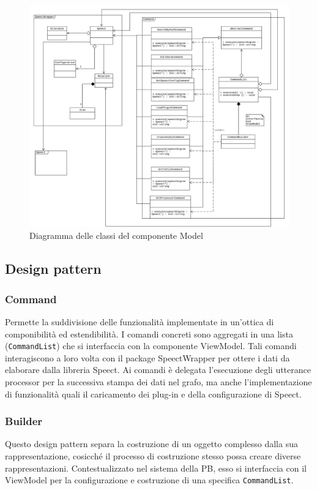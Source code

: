\documentclass[openany,12pt,a4paper]{report}
\begin{document}
	\begin{figure}[H]
		\includegraphics[scale=0.45]{ModelDiagram}
		\centering
		\caption{Diagramma delle classi del componente Model}
	\end{figure}
		
	\newpage
		
	\subsection{Design pattern}
	
	\subsubsection{Command}
	Permette la suddivisione delle funzionalità implementate in un'ottica di componibilità ed estendibilità. I comandi concreti sono aggregati in una lista (\verb|CommandList|) che si interfaccia con la componente ViewModel. Tali comandi interagiscono a loro volta con il package SpeectWrapper per ottere i dati da elaborare dalla libreria Speect. Ai comandi è delegata l'esecuzione degli utterance processor per la successiva stampa dei dati nel grafo, ma anche l'implementazione di funzionalità quali il caricamento dei plug-in e della configurazione di Speect.
	
	\subsubsection{Builder}
	Questo design pattern separa la costruzione di un oggetto complesso dalla sua rappresentazione, cosicché il processo di costruzione stesso possa creare diverse rappresentazioni. Contestualizzato nel sistema della PB, esso si interfaccia con il ViewModel per la configurazione e costruzione di una specifica \verb|CommandList|.
	
\end{document}

